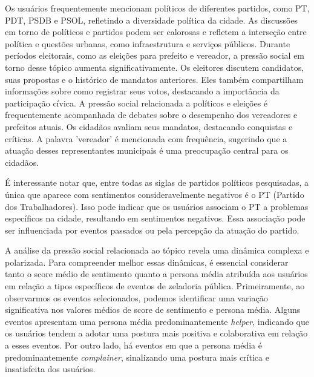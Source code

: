 Os usuários frequentemente mencionam políticos de diferentes partidos, como PT, PDT, PSDB e PSOL, refletindo a diversidade política da cidade. As discussões em torno de políticos e partidos podem ser calorosas e refletem a interseção entre política e questões urbanas, como infraestrutura e serviços públicos. Durante períodos eleitorais, como as eleições para prefeito e vereador, a pressão social em torno desse tópico aumenta significativamente. Os eleitores discutem candidatos, suas propostas e o histórico de mandatos anteriores. Eles também compartilham informações sobre como registrar seus votos, destacando a importância da participação cívica. A pressão social relacionada a políticos e eleições é frequentemente acompanhada de debates sobre o desempenho dos vereadores e prefeitos atuais. Os cidadãos avaliam seus mandatos, destacando conquistas e críticas. A palavra 'vereador' é mencionada com frequência, sugerindo que a atuação desses representantes municipais é uma preocupação central para os cidadãos.

É interessante notar que, entre todas as siglas de partidos políticos pesquisadas, a única que aparece com sentimentos consideravelmente negativos é o PT (Partido dos Trabalhadores). Isso pode indicar que os usuários associam o PT a problemas específicos na cidade, resultando em sentimentos negativos. Essa associação pode ser influenciada por eventos passados ou pela percepção da atuação do partido.

A análise da pressão social relacionada ao tópico revela uma dinâmica complexa e polarizada. Para compreender melhor essas dinâmicas, é essencial considerar tanto o score médio de sentimento quanto a persona média atribuída aos usuários em relação a tipos específicos de eventos de zeladoria pública. Primeiramente, ao observarmos os eventos selecionados, podemos identificar uma variação significativa nos valores médios de score de sentimento e persona média. Alguns eventos apresentam uma persona média predominantemente \textit{helper}, indicando que os usuários tendem a adotar uma postura mais positiva e colaborativa em relação a esses eventos. Por outro lado, há eventos em que a persona média é predominantemente \textit{complainer}, sinalizando uma postura mais crítica e insatisfeita dos usuários.

